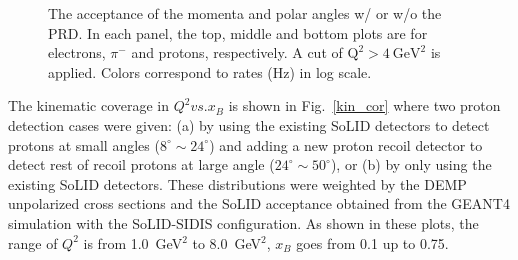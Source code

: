 \begin{figure}[!ht]
 \begin{center}
   \caption[The acceptance of the momenta and scattering angles for electrons,
     $\pi^{-}$ and protons]{\footnotesize{The acceptance of the momenta and
       polar angles w/ or w/o the PRD. In each panel, the top, middle and
       bottom plots are for electrons, $\pi^{-}$ and protons, respectively. A
       cut of $\mathrm{Q^{2}>4~GeV^{2}}$ is applied. Colors correspond to rates
       (Hz) in log scale.}}
  \label{p_theta}
  \end{center}
\end{figure}
The kinematic coverage in $Q^{2} vs. x_{B}$ is shown in Fig.~\ref{kin_cor}
where two proton detection cases were given: (a) by using the existing SoLID
detectors to detect protons at small angles ($8^{\circ}\sim24^{\circ}$) and
adding a new proton recoil detector to detect rest of recoil protons at large
angle ($24^{\circ}\sim50^{\circ}$), or (b) by only using the existing SoLID
detectors. These distributions were weighted by the DEMP unpolarized cross sections and the
SoLID acceptance obtained from the GEANT4 simulation with the SoLID-SIDIS
configuration. As shown in these plots, the range of $Q^{2}$ is from
1.0~GeV$^{2}$ to 8.0~GeV$^{2}$, $x_{B}$ goes from 0.1 up to 0.75.


